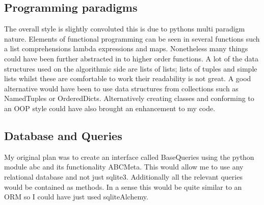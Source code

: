 \documentclass[11pt]{article}
\begin{document}
\subsection{Programming paradigms}
The overall style is slightly convoluted this is due to pythons multi paradigm nature. Elements of functional programming can be seen in several functions such a list comprehensions lambda expressions and maps. Nonetheless many things could have been further abstracted in to higher order functions. A lot of the data structures used on the algorithmic side are lists of lists; lists of tuples and simple lists whilst these are comfortable to work their readability is not great. A good alternative would have been to use data structures from collections such as NamedTuples or OrderedDicts. Alternatively creating classes and conforming to an OOP style could have also brought an enhancement to my code.
\subsection{Database and Queries}
My original plan was to create an interface called BaseQueries using the python module abc and its functionality ABCMeta. This would allow me to use any relational database and not just sqlite3. Additionally all the relevant queries would be contained as methods. In a sense this would be quite similar to an ORM so I could have just used sqliteAlchemy.
\end{document}
